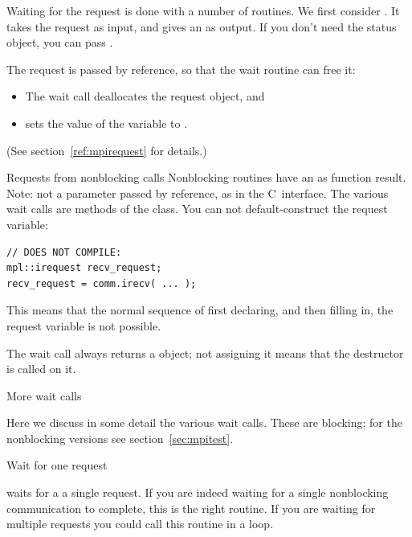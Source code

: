 Waiting for the request is done with a number of routines. We first
consider . It takes the request as input, and
gives an  as output. If you don't need the
status object, you can pass .


The request is passed by reference, so that the wait routine
can free it:
\begin{itemize}
\item The wait call deallocates the request object, and
\item sets the value of the variable to .
\end{itemize}
(See section~\ref{ref:mpirequest} for details.)

\begin{mplnote}{Requests from nonblocking calls}
  \label{mpl:irequest}
  Nonblocking routines have an  as function result.
  Note: not a parameter passed by reference, as in the C~interface.
  The various wait calls are methods of the 
  class.
  You can not default-construct the request variable:
\begin{lstlisting}
// DOES NOT COMPILE:
mpl::irequest recv_request;
recv_request = comm.irecv( ... );
\end{lstlisting}
This means that the normal sequence of first declaring, and then filling in,
the request variable is not possible.

\begin{mplimpl}
  The wait call always returns a  object;
  not assigning it means that the destructor is called on it.
\end{mplimpl}
\end{mplnote}

 {More wait calls}
\label{sec:waittest}

Here we discuss in some detail the various wait calls.
These are blocking; for the nonblocking versions
see section~\ref{sec:mpitest}.

 {Wait for one request}

 waits for a a single request. If you are
indeed waiting for a single nonblocking communication to complete,
this is the right routine. If you are waiting for multiple requests
you could call this routine in a loop.

